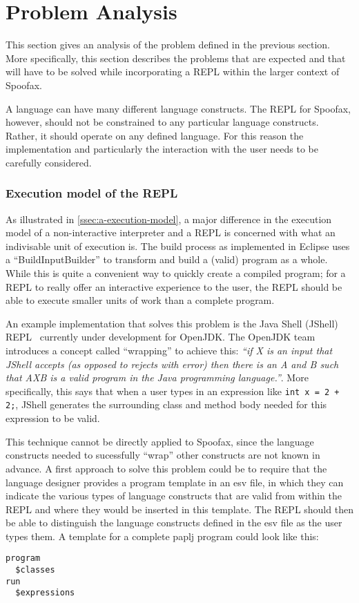 \section{Problem Analysis}
\label{sec:a-problem-analysis}

This section gives an analysis of the problem defined in the previous section.
More specifically, this section describes the problems that are expected and
that will have to be solved while incorporating a REPL
within the larger context of Spoofax.

A language can have many different language constructs. The REPL for Spoofax,
however, should not be constrained to any particular language constructs.
Rather, it should operate on any defined language. For this reason the
implementation and particularly the interaction with the user needs to be
carefully considered.

\subsubsection{Execution model of the REPL}
\label{ssec:a-execution-model-repl}
As illustrated in \cref{ssec:a-execution-model}, a major difference in the
execution model of a non-interactive interpreter and a REPL is concerned with
what an indivisable unit of execution is. The build process as implemented in
Eclipse uses a ``BuildInputBuilder'' to transform and build a (valid) program
as a whole. While this is quite a convenient way to quickly create a compiled
program; for a REPL to really offer an interactive experience to the user, the
REPL should be able to execute smaller units of work than a complete program.

An example implementation that solves this problem is the Java Shell (JShell)
REPL~\cite{jshell-repl} currently under development for OpenJDK. The OpenJDK
team introduces a concept called ``wrapping'' to achieve this: \textit{``if X
is an input that JShell accepts (as opposed to rejects with error) then there
is an A and B such that AXB is a valid program in the Java programming
language.''}. More specifically, this says that when a user types in an
expression like \texttt{int x = 2 + 2;}, JShell generates the surrounding class and
method body needed for this expression to be valid.

This technique cannot be directly applied to Spoofax, since the language
constructs needed to sucessfully ``wrap'' other constructs are not known in
advance. A first approach to solve this problem could be to require that the
language designer provides a program template in an esv file, in which they can
indicate the various types of language constructs that are valid from within
the REPL and where they would be inserted in this template. The REPL should
then be able to distinguish the language constructs defined in the esv file as
the user types them. A template for a complete paplj program could look like
this:
\begin{lstlisting}
program
  $classes
run
  $expressions
\end{lstlisting}

